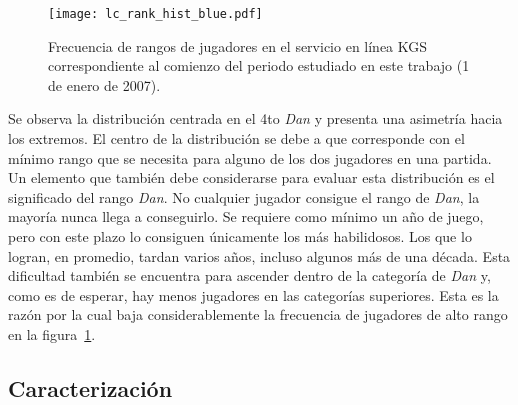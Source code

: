 \documentclass[11pt,twoside,spanish]{report} %
\begin{document}
\begin{figure}[H]
    \centering
    \texttt{[image: lc\_rank\_hist\_blue.pdf]}
    \caption{Frecuencia de rangos de jugadores en el servicio en l\'inea KGS correspondiente al comienzo del periodo estudiado en este trabajo (1 de enero de 2007).}
    \label{fig:rank_hist}
\end{figure}

Se observa la distribuci\'on  centrada en el 4to \textit{Dan} y presenta una asimetr\'ia hacia los extremos.
El centro de la distribuci\'on se debe a que corresponde con el m\'inimo rango que se necesita para alguno de los dos jugadores en una partida.
Un elemento que tambi\'en debe considerarse para evaluar esta distribuci\'on es el significado del rango \textit{Dan}.
No cualquier jugador consigue el rango de \emph{Dan}, la mayor\'ia nunca llega a conseguirlo.
Se requiere como m\'inimo un a\~no de juego, pero con este plazo lo consiguen \'unicamente los m\'as habilidosos.
Los que lo logran, en promedio, tardan varios a\~nos, incluso algunos m\'as de una d\'ecada.
Esta dificultad tambi\'en se encuentra para ascender dentro de la categor\'ia de \textit{Dan} y, como es de esperar, hay menos jugadores en las categor\'ias superiores.
Esta es la raz\'on por la cual baja considerablemente la frecuencia de jugadores de alto rango en la figura~\ref{fig:rank_hist}.








\subsection{Caracterizaci\'on}
\end{document}
